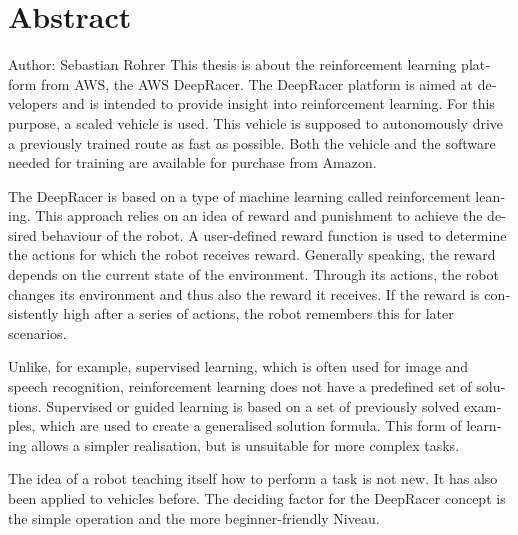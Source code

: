 \chapter{Abstract}

\begin{english} %
Author: Sebastian Rohrer \newline
This thesis is about the reinforcement learning platform from AWS, the AWS DeepRacer. The DeepRacer platform is aimed at developers and is intended to provide insight into reinforcement learning. For this purpose, a scaled vehicle is used. This vehicle is supposed to autonomously drive a previously trained route as fast as possible. Both the vehicle and the software needed for training are available for purchase from Amazon.

The DeepRacer is based on a type of machine learning called reinforcement leaning. This approach relies on an idea of reward and punishment to achieve the desired behaviour of the robot. A user-defined reward function is used to determine the actions for which the robot receives reward. Generally speaking, the reward depends on the current state of the environment. Through its actions, the robot changes its environment and thus also the reward it receives. If the reward is consistently high after a series of actions, the robot remembers this for later scenarios.

Unlike, for example, supervised learning, which is often used for image and speech recognition, reinforcement learning does not have a predefined set of solutions. Supervised or guided learning is based on a set of previously solved examples, which are used to create a generalised solution formula. This form of learning allows a simpler realisation, but is unsuitable for more complex tasks. 

The idea of a robot teaching itself how to perform a task is not new. It has also been applied to vehicles before. The deciding factor for the DeepRacer concept is the simple operation and the more beginner-friendly Niveau. 
\end{english}
